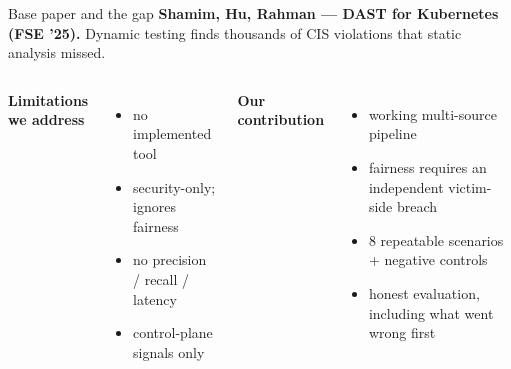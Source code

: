 \documentclass[aspectratio=169,11pt]{beamer}
\begin{document}
\begin{frame}{Base paper and the gap}
\textbf{Shamim, Hu, Rahman --- DAST for Kubernetes (FSE '25).} Dynamic testing finds thousands of CIS violations that static analysis missed.
\vspace{2mm}
\begin{columns}[T]
\textbf{Limitations we address}
\begin{itemize}
\item no implemented tool
\item security-only; ignores fairness
\item no precision / recall / latency
\item control-plane signals only
\end{itemize}
\textbf{Our contribution}
\begin{itemize}
\item working multi-source pipeline
\item fairness requires an \alert{independent victim-side} breach
\item 8 repeatable scenarios + negative controls
\item honest evaluation, including what went wrong first
\end{itemize}
\end{columns}
\end{frame}
\end{document}
